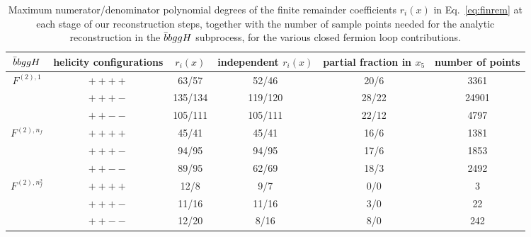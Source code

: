 \documentclass[main.tex]{subfiles}
\begin{document}
\renewcommand{\arraystretch}{1.5}
\begin{table}[t!]
\centering
\begin{tabularx}{0.95\textwidth}{|C{0.8}|C{1.2}|C{0.8}|C{1.0}|C{1.2}|C{1.0}|}
\hline
 $\bar{b}bggH$     & helicity configurations & $r_i(x)$ & independent $r_i(x)$ & partial fraction in $x_5$ & number of points \\
\hline
$F^{(2),1}$ & $++++$ & 63/57   & 52/46   & 20/6  & 3361 \\
            & $+++-$ & 135/134 & 119/120 & 28/22 & 24901 \\
            & $++--$ & 105/111 & 105/111 & 22/12 & 4797 \\
\hline
$F^{(2),n_f}$ & $++++$ & 45/41 & 45/41 & 16/6 & 1381 \\
              & $+++-$ & 94/95 & 94/95 & 17/6 & 1853 \\
              & $++--$ & 89/95 & 62/69 & 18/3 & 2492 \\
\hline
$F^{(2),n_f^2}$ & $++++$ & 12/8  & 9/7   & 0/0 & 3 \\
                & $+++-$ & 11/16 & 11/16 & 3/0 & 22 \\
                & $++--$ & 12/20 & 8/16  & 8/0 & 242 \\
\hline
\end{tabularx}
\caption{\label{tab:degrees2g2bH} Maximum numerator/denominator polynomial degrees of the finite remainder coefficients $r_i(x)$ in Eq.~\ref{eq:finrem} 
at each stage of our reconstruction steps, together with the number of sample points needed for the analytic reconstruction in the $\bar{b}bggH$ subprocess, for the various closed fermion loop contributions.}
\end{table}
\end{document}
